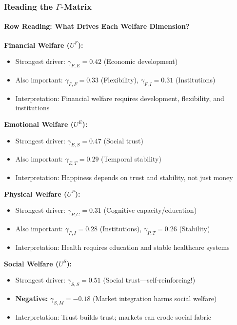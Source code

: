 \subsubsection{Reading the $\Gamma$-Matrix}

\paragraph{Row Reading: What Drives Each Welfare Dimension?}

\textbf{Financial Welfare ($U^F$):}
\begin{itemize}
\item Strongest driver: $\gamma_{F,E} = 0.42$ (Economic development)
\item Also important: $\gamma_{F,F} = 0.33$ (Flexibility), $\gamma_{F,I} = 0.31$ (Institutions)
\item Interpretation: Financial welfare requires development, flexibility, and institutions
\end{itemize}

\textbf{Emotional Welfare ($U^E$):}
\begin{itemize}
\item Strongest driver: $\gamma_{E,S} = 0.47$ (Social trust)
\item Also important: $\gamma_{E,T} = 0.29$ (Temporal stability)
\item Interpretation: Happiness depends on trust and stability, not just money
\end{itemize}

\textbf{Physical Welfare ($U^P$):}
\begin{itemize}
\item Strongest driver: $\gamma_{P,C} = 0.31$ (Cognitive capacity/education)
\item Also important: $\gamma_{P,I} = 0.28$ (Institutions), $\gamma_{P,T} = 0.26$ (Stability)
\item Interpretation: Health requires education and stable healthcare systems
\end{itemize}

\textbf{Social Welfare ($U^S$):}
\begin{itemize}
\item Strongest driver: $\gamma_{S,S} = 0.51$ (Social trust---self-reinforcing!)
\item \textbf{Negative:} $\gamma_{S,M} = -0.18$ (Market integration harms social welfare)
\item Interpretation: Trust builds trust; markets can erode social fabric
\end{itemize}

